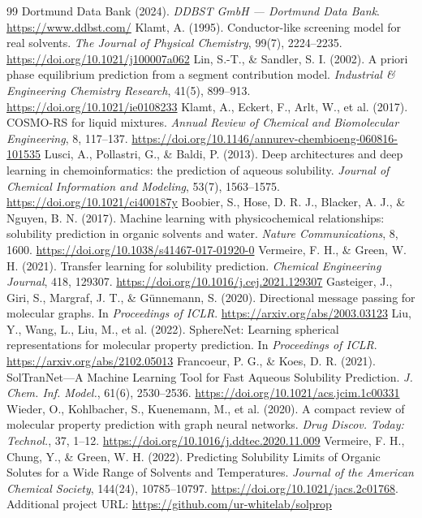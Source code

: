 \documentclass[11pt]{article}
\begin{document}
\begin{thebibliography}{99}
   Dortmund Data Bank (2024). \textit{DDBST GmbH --- Dortmund Data Bank}. \url{https://www.ddbst.com/}
   Klamt, A. (1995). Conductor-like screening model for real solvents. \textit{The Journal of Physical Chemistry}, 99(7), 2224--2235. \url{https://doi.org/10.1021/j100007a062}
   Lin, S.-T., \& Sandler, S. I. (2002). A priori phase equilibrium prediction from a segment contribution model. \textit{Industrial \& Engineering Chemistry Research}, 41(5), 899--913. \url{https://doi.org/10.1021/ie0108233}
   Klamt, A., Eckert, F., Arlt, W., et al. (2017). COSMO-RS for liquid mixtures. \textit{Annual Review of Chemical and Biomolecular Engineering}, 8, 117--137. \url{https://doi.org/10.1146/annurev-chembioeng-060816-101535}
   Lusci, A., Pollastri, G., \& Baldi, P. (2013). Deep architectures and deep learning in chemoinformatics: the prediction of aqueous solubility. \textit{Journal of Chemical Information and Modeling}, 53(7), 1563--1575. \url{https://doi.org/10.1021/ci400187y}
   Boobier, S., Hose, D. R. J., Blacker, A. J., \& Nguyen, B. N. (2017). Machine learning with physicochemical relationships: solubility prediction in organic solvents and water. \textit{Nature Communications}, 8, 1600. \url{https://doi.org/10.1038/s41467-017-01920-0}
   Vermeire, F. H., \& Green, W. H. (2021). Transfer learning for solubility prediction. \textit{Chemical Engineering Journal}, 418, 129307. \url{https://doi.org/10.1016/j.cej.2021.129307}
   Gasteiger, J., Giri, S., Margraf, J. T., \& Günnemann, S. (2020). Directional message passing for molecular graphs. In \textit{Proceedings of ICLR}. \url{https://arxiv.org/abs/2003.03123}
   Liu, Y., Wang, L., Liu, M., et al. (2022). SphereNet: Learning spherical representations for molecular property prediction. In \textit{Proceedings of ICLR}. \url{https://arxiv.org/abs/2102.05013}
   Francoeur, P. G., \& Koes, D. R. (2021). SolTranNet---A Machine Learning Tool for Fast Aqueous Solubility Prediction. \textit{J. Chem. Inf. Model.}, 61(6), 2530--2536. \url{https://doi.org/10.1021/acs.jcim.1c00331}
   Wieder, O., Kohlbacher, S., Kuenemann, M., et al. (2020). A compact review of molecular property prediction with graph neural networks. \textit{Drug Discov. Today: Technol.}, 37, 1--12. \url{https://doi.org/10.1016/j.ddtec.2020.11.009}
   Vermeire, F. H., Chung, Y., \& Green, W. H. (2022). Predicting Solubility Limits of Organic Solutes for a Wide Range of Solvents and Temperatures. \textit{Journal of the American Chemical Society}, 144(24), 10785--10797. \url{https://doi.org/10.1021/jacs.2c01768}. Additional project URL: \url{https://github.com/ur-whitelab/solprop}

\end{thebibliography}
\end{document}
